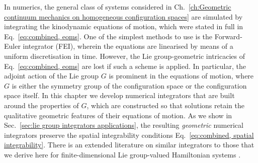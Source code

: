 In numerics, the general class of systems considered in Ch.~\ref{ch:Geometric continuum mechanics on homogeneous configuration spaces} are simulated by integrating the kinodynamic equations of motion, which were stated in full in Eq.~\ref{eq:combined, eoms}. One of the simplest methods to use is the Forward-Euler integrator (FEI), wherein the equations are linearised by means of a uniform discretisation in time. However, the Lie group-geometric intricacies of Eq.~\ref{eq:combined, eoms} are lost if such a scheme is applied. In particular, the adjoint action of the Lie group $G$ is prominent in the equations of motion, where $G$ is either the symmetry group of the configuration space or the configuration space itself. In this chapter we develop numerical integrators that are built around the properties of $G$, which are constructed so that solutions retain the qualitative geometric features of their equations of motion. As we show in Sec.~\ref{sec:lie group integrators applications}, the resulting \textit{geometric} numerical integrators preserve the spatial integrability conditions Eq.~\ref{eq:combined, spatial integrability}. There is an extended literature on similar integrators to those that we derive here for finite-dimensional Lie group-valued Hamiltonian systems \citep{kaasHighOrderRungeKutta1999a, buddGeometricIntegrationNumerical1999, engoNumericalIntegrationLie2001}.

